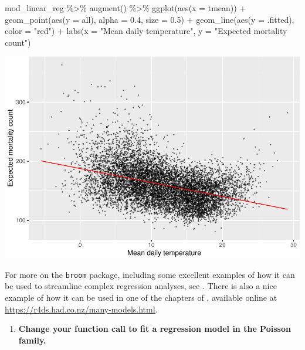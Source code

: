 \documentclass[
]{book}
\newenvironment{Shaded}{\begin{snugshade}}{\end{snugshade}}
\newcommand{\AttributeTok}[1]{\textcolor[rgb]{0.77,0.63,0.00}{#1}}
\newcommand{\FloatTok}[1]{\textcolor[rgb]{0.00,0.00,0.81}{#1}}
\newcommand{\FunctionTok}[1]{\textcolor[rgb]{0.00,0.00,0.00}{#1}}
\newcommand{\NormalTok}[1]{#1}
\newcommand{\SpecialCharTok}[1]{\textcolor[rgb]{0.00,0.00,0.00}{#1}}
\newcommand{\StringTok}[1]{\textcolor[rgb]{0.31,0.60,0.02}{#1}}
\providecommand{\tightlist}{%
  \setlength{\itemsep}{0pt}\setlength{\parskip}{0pt}}
\begin{document}
\begin{Shaded}
\begin{Highlighting}[]
\NormalTok{mod\_linear\_reg }\SpecialCharTok{\%\textgreater{}\%} 
  \FunctionTok{augment}\NormalTok{() }\SpecialCharTok{\%\textgreater{}\%} 
  \FunctionTok{ggplot}\NormalTok{(}\FunctionTok{aes}\NormalTok{(}\AttributeTok{x =}\NormalTok{ tmean)) }\SpecialCharTok{+} 
  \FunctionTok{geom\_point}\NormalTok{(}\FunctionTok{aes}\NormalTok{(}\AttributeTok{y =}\NormalTok{ all), }\AttributeTok{alpha =} \FloatTok{0.4}\NormalTok{, }\AttributeTok{size =} \FloatTok{0.5}\NormalTok{) }\SpecialCharTok{+} 
  \FunctionTok{geom\_line}\NormalTok{(}\FunctionTok{aes}\NormalTok{(}\AttributeTok{y =}\NormalTok{ .fitted), }\AttributeTok{color =} \StringTok{"red"}\NormalTok{) }\SpecialCharTok{+} 
  \FunctionTok{labs}\NormalTok{(}\AttributeTok{x =} \StringTok{"Mean daily temperature"}\NormalTok{, }\AttributeTok{y =} \StringTok{"Expected mortality count"}\NormalTok{)}
\end{Highlighting}
\end{Shaded}

\includegraphics{adv_epi_analysis_files/figure-latex/unnamed-chunk-28-1.pdf}

For more on the \texttt{broom} package, including some excellent examples of how it
can be used to streamline complex regression analyses, see \citet{robinson2014broom}.
There is also a nice example of how it can be used in one of the chapters of
\citet{wickham2016r}, available online at \url{https://r4ds.had.co.nz/many-models.html}.

\begin{enumerate}
\def\labelenumi{\arabic{enumi}.}
\setcounter{enumi}{1}
\tightlist
\item
  \textbf{Change your function call to fit a regression model in the Poisson family.}
\end{enumerate}
\end{document}
